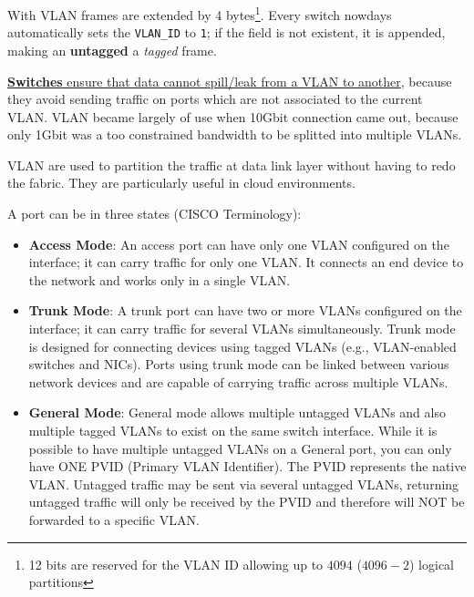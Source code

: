 With VLAN frames are extended by 4 bytes\footnote{12 bits are reserved for the VLAN ID allowing up to $4094$ ($4096-2$) logical partitions}. Every switch nowdays automatically sets the \texttt{VLAN\_ID} to \texttt{1}; if the field is not existent, it is appended, making an \textbf{untagged} a \textit{tagged} frame.

\ul{\textbf{Switches} ensure that data cannot spill/leak from a VLAN to another}, because they avoid sending traffic on ports which are not associated to the current VLAN.
VLAN became largely of use when 10Gbit connection came out, because only 1Gbit was a too constrained bandwidth to be splitted into multiple VLANs. 

VLAN are used to partition the traffic at data link layer without having to redo the fabric. They are particularly useful in cloud environments.

{
A port can be in three states (CISCO Terminology):\ns
\begin{itemize}
   

   \item \textbf{Access Mode}: An access port can have only one VLAN configured on the interface; it can carry traffic for only one VLAN. It connects an end device to the network and works only in a single VLAN.

   \item \textbf{Trunk Mode}: A trunk port can have two or more VLANs configured on the interface; it can carry traffic for several VLANs simultaneously. Trunk mode is designed for connecting devices using tagged VLANs (e.g., VLAN-enabled switches and NICs). Ports using trunk mode can be linked between various network devices and are capable of carrying traffic across multiple VLANs.

   \item \textbf{General Mode}: General mode allows multiple untagged VLANs and also multiple tagged VLANs to exist on the same switch interface. While it is possible to have multiple untagged VLANs on a General port, you can only have ONE PVID (Primary VLAN Identifier). The PVID represents the native VLAN. Untagged traffic may be sent via several untagged VLANs, returning untagged traffic will only be received by the PVID and therefore will NOT be forwarded to a specific VLAN.

   \end{itemize}
}

